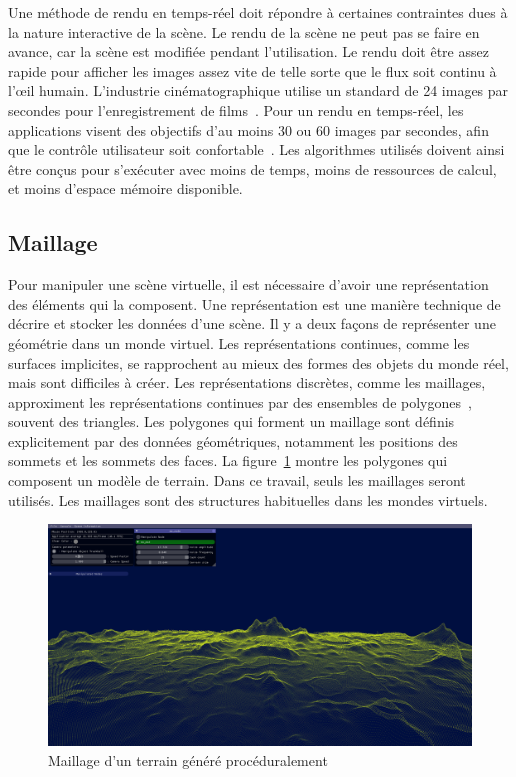 Une méthode de rendu en temps-réel doit répondre à certaines contraintes dues à la nature interactive de la scène. Le rendu de la scène ne peut pas se faire en avance, car la scène est modifiée pendant l'utilisation. Le rendu doit être assez rapide pour afficher les images assez vite de telle sorte que le flux soit continu à l'œil humain. L'industrie cinématographique utilise un standard de 24 images par secondes pour l'enregistrement de films~\cite{deguzman_why_2023}. Pour un rendu en temps-réel, les applications visent des objectifs d'au moins 30 ou 60 images par secondes, afin que le contrôle utilisateur soit confortable~\cite{janzen_is_2014}. Les algorithmes utilisés doivent ainsi être conçus pour s'exécuter avec moins de temps, moins de ressources de calcul, et moins d'espace mémoire disponible.

\subsection*{Maillage}

Pour manipuler une scène virtuelle, il est nécessaire d'avoir une représentation des éléments qui la composent. Une représentation est une manière technique de décrire et stocker les données d'une scène. Il y a deux façons de représenter une géométrie dans un monde virtuel. Les représentations continues, comme les surfaces implicites, se rapprochent au mieux des formes des objets du monde réel, mais sont difficiles à créer. Les représentations discrètes, comme les maillages, approximent les représentations continues par des ensembles de polygones~\cite{coons_surfaces_1967}, souvent des triangles. Les polygones qui forment un maillage sont définis explicitement par des données géométriques, notamment les positions des sommets et les sommets des faces. La figure~\ref{fig:procedural-mesh} montre les polygones qui composent un modèle de terrain. Dans ce travail, seuls les maillages seront utilisés. Les maillages sont des structures habituelles dans les mondes virtuels.

\begin{figure}[h!]
    \centering
    \includegraphics[width=\textwidth]{contenu/resources/images/full_terrain}
    \caption{Maillage d'un terrain généré procéduralement}
    \label{fig:procedural-mesh}
\end{figure}

